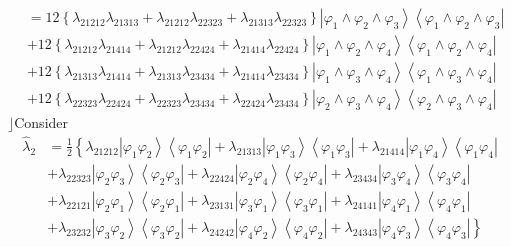 \documentclass[aps,preprint]{revtex4}%
\begin{document}
\begin{align}
&  =12\left\{  \lambda_{21212}\lambda_{21313}+\lambda_{21212}\lambda
_{22323}+\lambda_{21313}\lambda_{22323}\right\}  \left\vert \varphi_{1}%
\wedge\varphi_{2}\wedge\varphi_{3}\right\rangle \left\langle \varphi_{1}%
\wedge\varphi_{2}\wedge\varphi_{3}\right\vert \nonumber\\
&  +12\left\{  \lambda_{21212}\lambda_{21414}+\lambda_{21212}\lambda
_{22424}+\lambda_{21414}\lambda_{22424}\right\}  \left\vert \varphi_{1}%
\wedge\varphi_{2}\wedge\varphi_{4}\right\rangle \left\langle \varphi_{1}%
\wedge\varphi_{2}\wedge\varphi_{4}\right\vert \nonumber\\
&  +12\left\{  \lambda_{21313}\lambda_{21414}+\lambda_{21313}\lambda
_{23434}+\lambda_{21414}\lambda_{23434}\right\}  \left\vert \varphi_{1}%
\wedge\varphi_{3}\wedge\varphi_{4}\right\rangle \left\langle \varphi_{1}%
\wedge\varphi_{3}\wedge\varphi_{4}\right\vert \nonumber\\
&  +12\left\{  \lambda_{22323}\lambda_{22424}+\lambda_{22323}\lambda
_{23434}+\lambda_{22424}\lambda_{23434}\right\}  \left\vert \varphi_{2}%
\wedge\varphi_{3}\wedge\varphi_{4}\right\rangle \left\langle \varphi_{2}%
\wedge\varphi_{3}\wedge\varphi_{4}\right\vert \nonumber
\end{align}
$\rfloor$Consider
\begin{align*}
\hat{\lambda}_{2}  &  =\frac{1}{2}\left\{  \lambda_{21212}\left\vert
\varphi_{1}\varphi_{2}\right\rangle \left\langle \varphi_{1}\varphi
_{2}\right\vert +\lambda_{21313}\left\vert \varphi_{1}\varphi_{3}\right\rangle
\left\langle \varphi_{1}\varphi_{3}\right\vert +\lambda_{21414}\left\vert
\varphi_{1}\varphi_{4}\right\rangle \left\langle \varphi_{1}\varphi
_{4}\right\vert \right. \\
&  +\lambda_{22323}\left\vert \varphi_{2}\varphi_{3}\right\rangle \left\langle
\varphi_{2}\varphi_{3}\right\vert +\lambda_{22424}\left\vert \varphi
_{2}\varphi_{4}\right\rangle \left\langle \varphi_{2}\varphi_{4}\right\vert
+\lambda_{23434}\left\vert \varphi_{3}\varphi_{4}\right\rangle \left\langle
\varphi_{3}\varphi_{4}\right\vert \\
&  +\lambda_{22121}\left\vert \varphi_{2}\varphi_{1}\right\rangle \left\langle
\varphi_{2}\varphi_{1}\right\vert +\lambda_{23131}\left\vert \varphi
_{3}\varphi_{1}\right\rangle \left\langle \varphi_{3}\varphi_{1}\right\vert
+\lambda_{24141}\left\vert \varphi_{4}\varphi_{1}\right\rangle \left\langle
\varphi_{4}\varphi_{1}\right\vert \\
&  +\left.  \lambda_{23232}\left\vert \varphi_{3}\varphi_{2}\right\rangle
\left\langle \varphi_{3}\varphi_{2}\right\vert +\lambda_{24242}\left\vert
\varphi_{4}\varphi_{2}\right\rangle \left\langle \varphi_{4}\varphi
_{2}\right\vert +\lambda_{24343}\left\vert \varphi_{4}\varphi_{3}\right\rangle
\left\langle \varphi_{4}\varphi_{3}\right\vert \right\}
\end{align*}
\end{document}
